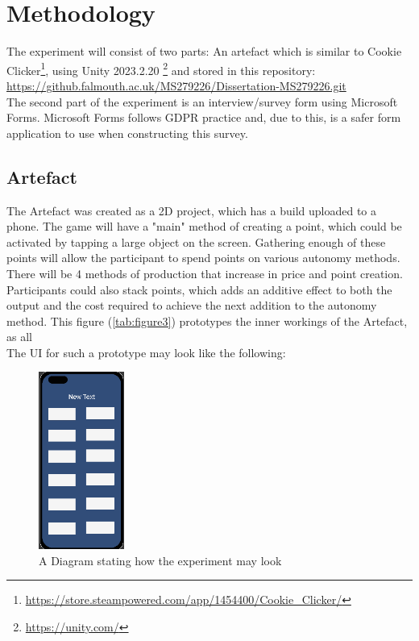 \documentclass[conference]{IEEEtran}
\begin{document}
\section{Methodology}
 The experiment will consist of two parts: An artefact which is similar to Cookie Clicker\footnote{\url{https://store.steampowered.com/app/1454400/Cookie_Clicker/}}, using Unity 2023.2.20  \footnote{\url{https://unity.com/}} and stored in this repository:\\

\url{https://github.falmouth.ac.uk/MS279226/Dissertation-MS279226.git}\\

The second part of the experiment is an interview/survey form using Microsoft Forms. Microsoft Forms follows GDPR practice and, due to this, is a safer form application to use when constructing this survey.

\subsection{Artefact}
The Artefact was created as a 2D project, which has a build uploaded to a phone. The game will have a "main" method of creating a point, which could be activated by tapping a large object on the screen. Gathering enough of these points will allow the participant to spend points on various autonomy methods. There will be 4 methods of production that increase in price and point creation. Participants could also stack points, which adds an additive effect to both the output and the cost required to achieve the next addition to the autonomy method. This figure (\ref{tab:figure3}) prototypes the inner workings of the Artefact, as all \\

The UI for such a prototype may look like the following:

\begin{figure}[H]
\begin{center}
\includegraphics[width = 0.25\textwidth, ]{Sim1}
\caption{A Diagram stating how the experiment may look}
\label{tab:figure1}
\end{center}
\end{figure}
\end{document}
